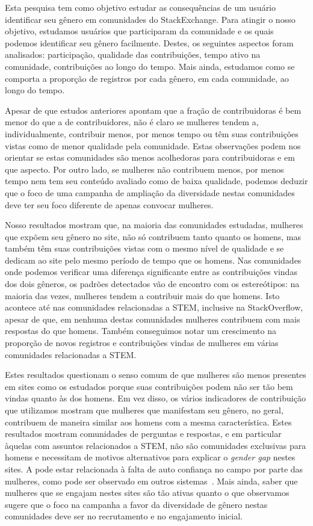 Esta pesquisa tem como objetivo estudar as consequências de um usuário identificar seu gênero em comunidades do StackExchange. Para atingir o nosso objetivo, estudamos usuários que participaram da comunidade e os quais podemos identificar seu gênero facilmente. Destes, os seguintes aspectos foram analisados: participação, qualidade das contribuições, tempo ativo na comunidade, contribuições ao longo do tempo. Mais ainda, estudamos como se comporta a proporção de registros por cada gênero, em cada comunidade, ao longo do tempo.

Apesar de que estudos anteriores apontam que a fração de contribuidoras é bem menor do que a de contribuidores, não é claro se mulheres tendem a, individualmente, contribuir menos, por menos tempo ou têm suas contribuições vistas como de menor qualidade pela comunidade. Estas observações podem nos orientar se estas comunidades são menos acolhedoras para contribuidoras e em que aspecto. Por outro lado, se mulheres não contribuem menos, por menos tempo nem tem seu conteúdo avaliado como de baixa qualidade, podemos deduzir que o foco de uma campanha de ampliação da diversidade nestas comunidades deve ter seu foco diferente de apenas convocar mulheres.

Nosso resultados mostram que, na maioria das comunidades estudadas, mulheres que expõem seu gênero no site, não só contribuem tanto quanto os homens, mas também têm suas contribuições vistas com o mesmo nível de qualidade e se dedicam ao site pelo mesmo período de tempo que os homens. Nas comunidades onde podemos verificar uma diferença significante entre as contribuições vindas dos dois gêneros, os padrões detectados vão de encontro com os estereótipos: na maioria das vezes, mulheres tendem a contribuir mais do que homens. Isto acontece até nas comunidades relacionadas a STEM, inclusive na StackOverflow, apesar de que, em nenhuma destas comunidades mulheres contribuem com mais respostas do que homens. Também conseguimos notar um crescimento na proporção de novos registros e contribuições vindas de mulheres em várias comunidades relacionadas a STEM.

Estes resultados questionam o senso comum de que mulheres são menos presentes em sites como os estudados porque suas contribuições podem não ser tão bem vindas quanto às dos homens. Em vez disso, os vários indicadores de contribuição que utilizamos mostram que mulheres que manifestam seu gênero, no geral, contribuem de maneira similar aos homens com a mesma característica. Estes resultados mostram comunidades de perguntas e respostas, e em particular àquelas com assuntos relacionados a STEM, não são comunidades exclusivas para homens e necessitam de motivos alternativos para explicar o \textit{gender gap} nestes sites. A  pode estar relacionada à falta de auto confiança no campo por parte das mulheres, como pode ser observado em outros sistemas~\cite{piazza:report}. Mais ainda, saber que mulheres que se engajam nestes sites são tão ativas quanto o que observamos sugere que o foco na campanha a favor da diversidade de gênero nestas comunidades deve ser no recrutamento e no engajamento inicial.


